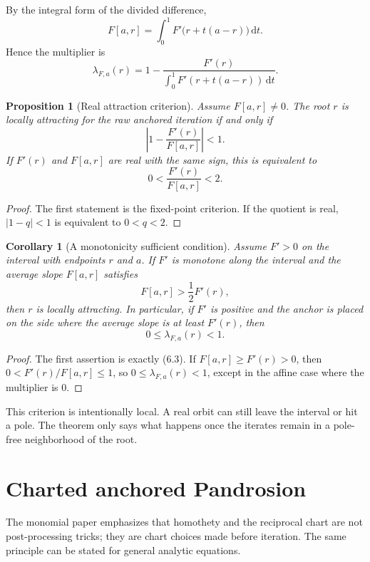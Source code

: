 \documentclass[11pt]{article}
\newtheorem{proposition}[theorem]{Proposition}
\newtheorem{corollary}[theorem]{Corollary}
\theoremstyle{definition}
\newcommand{\dd}{\,\mathrm{d}}
\begin{document}
By the integral form of the divided difference,
\[
        F[a,r]=\int_0^1 F'\bigl(r+t(a-r)\bigr)\dd t.
        \tag{6.1}
\]
Hence the multiplier is
\[
        \lambda_{F,a}(r)=1-\frac{F'(r)}{\int_0^1 F'(r+t(a-r))\dd t}.
        \tag{6.2}
\]

\begin{proposition}[Real attraction criterion]
Assume $F[a,r]\ne0$.  The root $r$ is locally attracting for the raw anchored iteration if and only if
\[
        \left|1-\frac{F'(r)}{F[a,r]}\right|<1.
\]
If $F'(r)$ and $F[a,r]$ are real with the same sign, this is equivalent to
\[
        0<\frac{F'(r)}{F[a,r]}<2.
        \tag{6.3}
\]
\end{proposition}

\begin{proof}
The first statement is the fixed-point criterion.  If the quotient is real, $|1-q|<1$ is equivalent to $0<q<2$.
\end{proof}

\begin{corollary}[A monotonicity sufficient condition]
Assume $F'>0$ on the interval with endpoints $r$ and $a$.
If $F'$ is monotone along the interval and the average slope $F[a,r]$ satisfies
\[
        F[a,r]>\frac12F'(r),
\]
then $r$ is locally attracting.  In particular, if $F'$ is positive and the anchor is placed on the side where the average slope is at least $F'(r)$, then
\[
        0\le \lambda_{F,a}(r)<1.
\]
\end{corollary}

\begin{proof}
The first assertion is exactly (6.3).  If $F[a,r]\ge F'(r)>0$, then $0<F'(r)/F[a,r]\le1$, so $0\le\lambda_{F,a}(r)<1$, except in the affine case where the multiplier is $0$.
\end{proof}

This criterion is intentionally local.  A real orbit can still leave the interval or hit a pole.  The theorem only says what happens once the iterates remain in a pole-free neighborhood of the root.

\section{Charted anchored Pandrosion}

The monomial paper emphasizes that homothety and the reciprocal chart are not post-processing tricks; they are chart choices made before iteration.  The same principle can be stated for general analytic equations.
\end{document}
